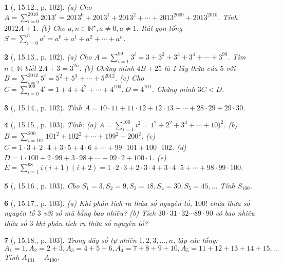 \documentclass{article}
\newtheorem{baitoan}{}
\begin{document}
\begin{baitoan}[\cite{TLCT_THCS_Toan_6_so_hoc}, 15.12., p. 102]
	(a) Cho $A = \sum_{i=0}^{2010} 2013^i = 2013^0 + 2013^1 + 2013^2 + \cdots + 2013^{2009} + 2013^{2010}$. Tính $2012A + 1$. (b) Cho $a,n\in\mathbb{N}^\star,a\ne0,a\ne1$. Rút gọn tổng $S = \sum_{i=0}^n a^i = a^0 + a^1 + a^2 + \cdots + a^n$.
\end{baitoan}

\begin{baitoan}[\cite{TLCT_THCS_Toan_6_so_hoc}, 15.13., p. 102]
	(a) Cho $A = \sum_{i=1}^{99} 3^i = 3 + 3^2 + 3^3 + 3^4 + \cdots + 3^{99}$. Tìm $n\in\mathbb{N}$ biết $2A + 3 = 3^{2n}$. (b) Chứng minh $4B + 25$ là 1 lũy thừa của $5$ với $B = \sum_{i=2}^{2012} 5^i = 5^2 + 5^3 + \cdots + 5^{2012}$. (c) Cho $C = \sum_{i=0}^{400} 4^i = 1 + 4 + 4^2 + \cdots + 4^{100},D = 4^{101}$. Chứng minh $3C < D$.
\end{baitoan}

\begin{baitoan}[\cite{TLCT_THCS_Toan_6_so_hoc}, 15.14., p. 102]
	Tính $A = 10\cdot11 + 11\cdot12 + 12\cdot13 + \cdots + 28\cdot29 + 29\cdot30$.
\end{baitoan}

\begin{baitoan}[\cite{TLCT_THCS_Toan_6_so_hoc}, 15.15., p. 103]
	Tính: (a) $A = \sum_{i=1}^{100} i^2 = 1^2 + 2^2 + 3^3 + \cdots + 10)^2$. (b) $B = \sum_{i=101}^{200} 101^2 + 102^2 + \cdots + 199^2 + 200^2$. (c) $C = 1\cdot3 + 2\cdot4 + 3\cdot5 + 4\cdot6 + \cdots + 99\cdot101 + 100\cdot102$. (d) $D = 1\cdot100 + 2\cdot99 + 3\cdot98 + \cdots + 99\cdot2 + 100\cdot1$. (e) $E = \sum_{i=1}^{98} i(i + 1)(i + 2) = 1\cdot2\cdot3 + 2\cdot3\cdot4 + 3\cdot4\cdot5 + \cdots + 98\cdot99\cdot100$.
\end{baitoan}

\begin{baitoan}[\cite{TLCT_THCS_Toan_6_so_hoc}, 15.16., p. 103]
	Cho $S_1 = 3,S_2 = 9,S_3 = 18,S_4 = 30,S_5 = 45,\ldots$ Tính $S_{100}$.
\end{baitoan}

\begin{baitoan}[\cite{TLCT_THCS_Toan_6_so_hoc}, 15.17., p. 103]
	(a) Khi phân tích ra thừa số nguyên tố, $100!$ chứa thừa số nguyên tố $3$ với số mũ bằng bao nhiêu? (b) Tích $30\cdot31\cdot32\cdots89\cdot90$ có bao nhiêu thừa số $3$ khi phân tích ra thừa số nguyên tố?
\end{baitoan}

\begin{baitoan}[\cite{TLCT_THCS_Toan_6_so_hoc}, 15.18., p. 103]
	Trong dãy số tự nhiên $1,2,3,\ldots,n$, lập các tổng: $A_1 = 1,A_2 = 2 + 3,A_3 = 4 + 5 + 6,A_4 = 7 + 8 + 9 +10,A_5 = 11 + 12 + 13 + 14 + 15,\ldots$ Tính $A_{101} - A_{100}$.
\end{baitoan}
\end{document}
